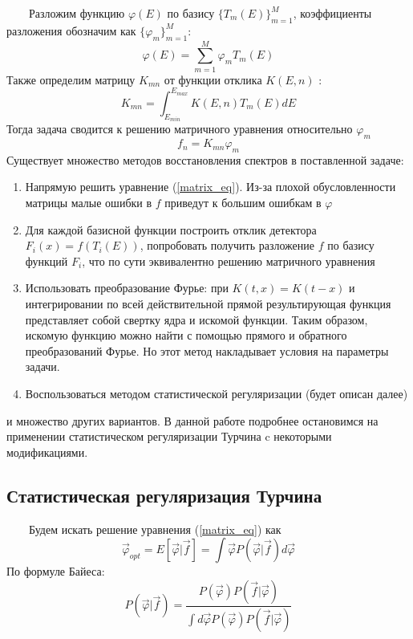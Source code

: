 \documentclass{config}
\begin{document}
~~~~Разложим функцию $\varphi(E)$ по базису $\{T_m(E)\}_{m=1}^M$, коэффициенты разложения обозначим как $\{\varphi_m\}_{m=1}^M$:
\begin{equation}
    \varphi(E) = \sum_{m=1}^M \varphi_m T_m(E)
\end{equation}
Также определим матрицу $K_{mn}$ от функции отклика $K(E, n)$ :
\begin{equation}
    K_{mn} = \int_{E_{min}}^{E_{max}} K(E, n) T_m(E) dE
\end{equation}
Тогда задача сводится к решению матричного уравнения относительно $\varphi_m$
\begin{equation} \label{matrix_eq}
    f_n = K_{mn} \varphi_m
\end{equation}
Существует множество методов восстановления спектров в поставленной задаче:
\begin{enumerate}
    \item Напрямую решить уравнение (\ref{matrix_eq}). Из-за плохой обусловленности матрицы малые ошибки в $f$ приведут к большим ошибкам в $\varphi$
    \item Для каждой базисной функции построить отклик детектора $F_i(x) = f(T_i(E))$, попробовать получить разложение $f$ по базису функций ${F_i}$, что по сути эквивалентно решению матричного уравнения
    \item Использовать преобразование Фурье: при $K(t, x) = K(t - x)$ и интегрировании по всей действительной прямой результирующая функция представляет собой свертку ядра и искомой функции. Таким образом, искомую функцию можно найти с помощью прямого и обратного преобразований Фурье. Но этот метод накладывает условия на параметры задачи.
    
    \item Воспользоваться методом статистической регуляризации (будет описан далее)
\end{enumerate}
и множество других вариантов. В данной работе подробнее остановимся на применении статистическом регуляризации Турчина c некоторыми модификациями.

\subsection{Статистическая регуляризация Турчина}
~~~~Будем искать решение уравнения (\ref{matrix_eq}) как
\begin{equation}
    \vec{\varphi}_{opt} = E[\vec{\varphi} | \vec{f}] = \int \vec{\varphi} P(\vec{\varphi} | \vec{f}) d \vec{\varphi}
\end{equation}
По формуле Байеса:
\begin{equation}
    P(\vec{\varphi} | \vec{f}) = \frac{P(\vec{\varphi})P(\vec{f} | \vec{\varphi})}{\int d \vec{\varphi} P(\vec{\varphi})P(\vec{f} | \vec{\varphi})}
\end{equation}
\end{document}
